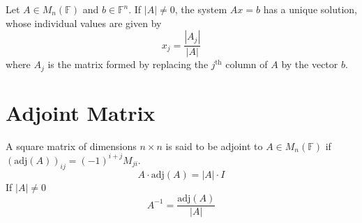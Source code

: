 \documentclass[fleqn]{article}
\begin{document}
Let $A \in M_n(\mathbb{F})$ and $b \in \mathbb{F}^n$. If $|A| \neq 0$, the system $A x = b$ has a unique solution, whose individual values are given by
\begin{equation*}
	x_j = \dfrac{|A_j|}{|A|}
\end{equation*}
where $A_j$ is the matrix formed by replacing the $j^{\text{th}}$ column of $A$ by the vector $b$.

\section{Adjoint Matrix}

A square matrix of dimensions $n \times n$ is said to be adjoint to $A \in M_n(\mathbb{F})$ if $(\text{adj}(A))_{ij} = (-1)^{i + j} M_{ji}$.
\begin{equation*}
	A \cdot \text{adj}(A) = |A| \cdot I
\end{equation*}
If $|A| \neq 0$
\begin{equation*}
	A^{-1} = \dfrac{\text{adj}(A)}{|A|}
\end{equation*}
\end{document}
